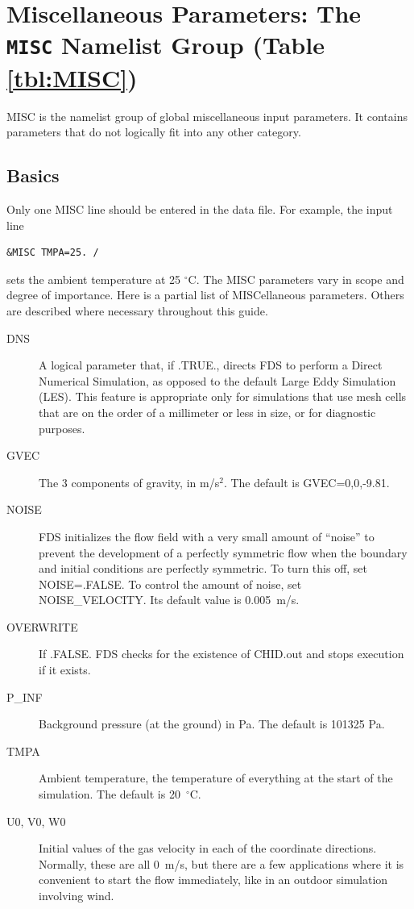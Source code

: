 \documentclass[11pt]{book}
\begin{document}
\section{Miscellaneous Parameters: The \texorpdfstring{{\tt MISC}}{MISC} Namelist Group (Table \ref{tbl:MISC})}
\label{info:MISC}

{\ct MISC} is the namelist group of global miscellaneous input parameters. It contains parameters that do not logically fit into any other category.

\subsection{Basics}
\label{info:MISC_Basics}

Only one {\ct MISC} line should be entered in the data file. For example, the input line
\begin{lstlisting}
&MISC TMPA=25. /
\end{lstlisting}
sets the ambient temperature at 25 $^\circ$C. The {\ct MISC} parameters vary in scope and degree of importance. Here is a partial list of {\ct MISC}ellaneous parameters. Others are described where necessary throughout this guide.
\begin{description}
\item[{\ct DNS}] A logical parameter that, if {\ct .TRUE.}, directs FDS to perform a Direct Numerical Simulation,
as opposed to the default Large Eddy Simulation (LES). This feature is appropriate only for simulations that use mesh cells that are
on the order of a millimeter or less in size, or for diagnostic purposes.
\item[{\ct GVEC}] The 3 components of gravity, in m/s$^2$. The default is {\ct GVEC=0,0,-9.81}.
\item[{\ct NOISE}] FDS initializes the flow field with a very small amount of ``noise'' to prevent the
development of a perfectly symmetric flow when the boundary
and initial conditions are perfectly symmetric. To turn this off, set {\ct NOISE=.FALSE.} To control the amount of noise, set {\ct NOISE\_VELOCITY}. Its default value is 0.005~m/s.
\item[{\ct OVERWRITE}] If {\ct .FALSE.} FDS checks for the existence of  {\ct CHID.out} and stops execution if it exists.
\item[{\ct P\_INF}] Background pressure (at the ground) in Pa. The default is 101325 Pa.
\item[{\ct TMPA}] Ambient temperature, the temperature of everything at the start of the simulation. The default is 20~$^\circ$C.
\item[{\ct U0, V0, W0}] Initial values of the gas velocity in each of the coordinate directions. Normally, these are all 0~m/s, but there are a few applications where it is
convenient to start the flow immediately, like in an outdoor simulation involving wind.
\end{description}
\end{document}
